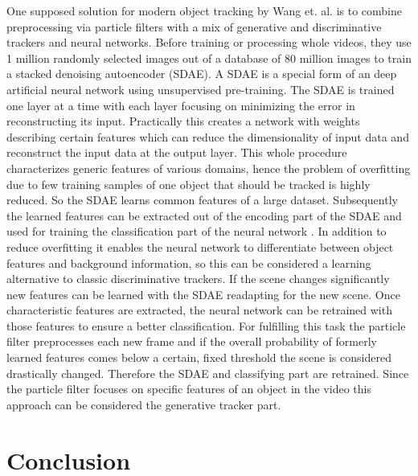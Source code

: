 \documentclass[12pt,twoside]{article}
\theoremstyle{plain}
\theoremstyle{definition}
\theoremstyle{remark}
\begin{document}
One supposed solution for modern object tracking by Wang et. al. \cite{LearningDeepCompactImageTracking-Wang} is to combine preprocessing via particle filters with a mix of generative and discriminative trackers and neural networks. Before training or processing whole videos, they use 1 million randomly selected images out of a database of 80 million images to train a stacked denoising autoencoder (SDAE). A SDAE is a special form of an deep artificial neural network using unsupervised pre-training. The SDAE is trained one layer at a time with each layer focusing on minimizing the error in reconstructing its input. Practically this creates a network with weights describing certain features which can reduce the dimensionality of input data and reconstruct the input data at the output layer. This whole procedure characterizes generic features of various domains, hence the problem of overfitting due to few training samples of one object that should be tracked is highly reduced. So the SDAE learns common features of a large dataset. Subsequently the learned features can be extracted out of the encoding part of the SDAE and used for training the classification part of the neural network \cite{LearningDeepCompactImageTracking-Wang}. In addition to reduce overfitting it enables the neural network to differentiate between object features and background information, so this can be considered a learning alternative to classic discriminative trackers. If the scene changes significantly new features can be learned with the SDAE readapting for the new scene. Once characteristic features are extracted, the neural network can be retrained with those features to ensure a better classification. For fulfilling this task the particle filter preprocesses each new frame and if the overall probability of formerly learned features comes below a certain, fixed threshold the scene is considered drastically changed. Therefore the SDAE and classifying part  are retrained. Since the particle filter focuses on specific features of an object in the video this approach can be considered the generative tracker part.



\section{Conclusion}
\label{sec:concl}
\end{document}
